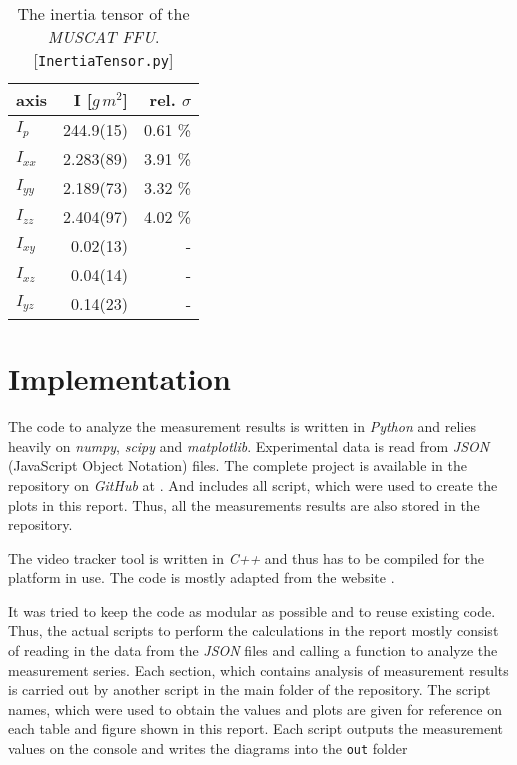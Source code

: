 \documentclass[journal]{IEEEtran}
\begin{document}
\begin{table}
	\centering
	\begin{tabular}{l | r r}
		axis	& I [$\unit{g\,m^2}$]		& rel. $\sigma$ \\
		\hline
		$I_p$		& 244.9(15)	& 0.61 \% \\
		$I_{xx}$	&	2.283(89)	& 3.91 \% \\
		$I_{yy}$	&	2.189(73)	& 3.32 \% \\
		$I_{zz}$	&	2.404(97)	& 4.02 \% \\
		$I_{xy}$	&	0.02(13)	& - \\
		$I_{xz}$	&	0.04(14)	& - \\
		$I_{yz}$	&	0.14(23)	& - \\
	\end{tabular}
	\caption{The inertia tensor of the \emph{MUSCAT FFU}. [\texttt{InertiaTensor.py}]}
	\label{tab:FFUInertiaTensor}
\end{table}

\section{Implementation}

The code to analyze the measurement results is written in \emph{Python} and relies heavily on \emph{numpy}, \emph{scipy} and \emph{matplotlib}.
Experimental data is read from \emph{JSON} (JavaScript Object Notation) files.
The complete project is available in the repository on \emph{GitHub} at \cite{website:github}.
And includes all script, which were used to create the plots in this report.
Thus, all the measurements results are also stored in the repository. 

The video tracker tool is written in \emph{C++} and thus has to be compiled for the platform in use. The code is mostly adapted from the website \cite{website:opencv}.

It was tried to keep the code as modular as possible and to reuse existing code. Thus, the actual scripts to perform the calculations in the report mostly consist of reading in the data from the \emph{JSON} files and calling a function to analyze the measurement series.
Each section, which contains analysis of measurement results is carried out by another script in the main folder of the repository. The script names, which were used to obtain the values and plots are given for reference on each table and figure shown in this report.
Each script outputs the measurement values on the console and writes the diagrams into the \texttt{out} folder 
\end{document}
